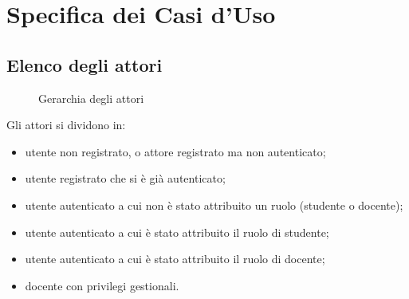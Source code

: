 \documentclass[a4paper, titlepage]{article}
\begin{document}
\newpage

\section{Specifica dei Casi d'Uso}
\subsection{Elenco degli attori}

\begin{figure}[H]
	\centering
	\noindent{}
	\caption{Gerarchia degli attori}
\end{figure}

Gli attori si dividono in:
\begin{itemize}

\item {} utente non registrato, o attore registrato ma non autenticato;
\item {} utente registrato che si è già autenticato;
\item {} utente autenticato a cui non è stato attribuito un ruolo (studente o docente);
\item {} utente autenticato a cui è stato attribuito il ruolo di studente;
\item {} utente autenticato a cui è stato attribuito il ruolo di docente;
\item {} docente con privilegi gestionali.
\end{itemize}
\end{document}
